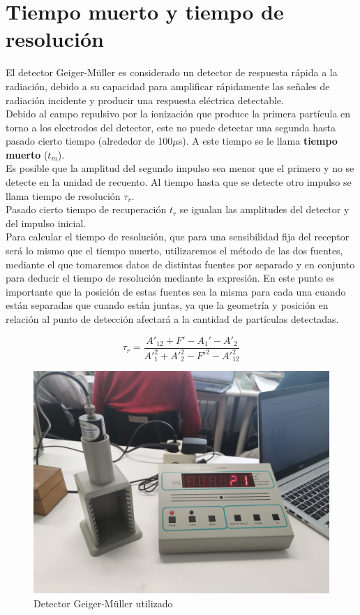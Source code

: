 \documentclass[a4paper,12pt,spanish]{article}
\begin{document}
	\section{Tiempo muerto y tiempo de resolución}
	
	El detector Geiger-Müller es considerado un detector de respuesta rápida a la radiación, debido a su capacidad para amplificar rápidamente las señales de radiación incidente y producir una respuesta eléctrica detectable. \\
	
	Debido al campo repulsivo por la ionización que produce la primera partícula en torno a los electrodos del detector, este no puede detectar una segunda hasta pasado cierto tiempo (alrededor de 100$\mu$s). A este tiempo se le llama \textbf{tiempo muerto} ($t_m$). \\
	Es posible que la amplitud del segundo impulso sea menor que el primero y no se detecte en la unidad de recuento. Al tiempo hasta que se detecte otro impulso se llama tiempo de resolución $\tau_r$.\\
	
	Pasado cierto tiempo de recuperación $t_r$ se igualan las amplitudes del detector y del impulso inicial.\\
	
	
	Para calcular el tiempo de resolución, que para una sensibilidad fija del receptor será lo mismo que el tiempo muerto, utilizaremos el método de las dos fuentes, mediante el que tomaremos datos de distintas fuentes por separado y en conjunto para deducir el tiempo de resolución mediante la expresión. En este punto es importante que la posición de estas fuentes sea la misma para cada una cuando están separadas que cuando están juntas, ya que la geometría y posición en relación al punto de detección afectará a la cantidad de partículas detectadas. 
	
	\[ \tau_r = \frac{A'_{12}+ F' - A_1'- A'_2}{A'^2_1 + A'^2_2 - F'^2 - A'^2_{12}}
	\]
	
	
	\begin{figure}[]
		\centering
		\includegraphics[width=0.7\linewidth]{imagenes/detector}
		\caption{Detector Geiger-Müller utilizado}
		\label{fig:detector}
	\end{figure}
	
\end{document}
